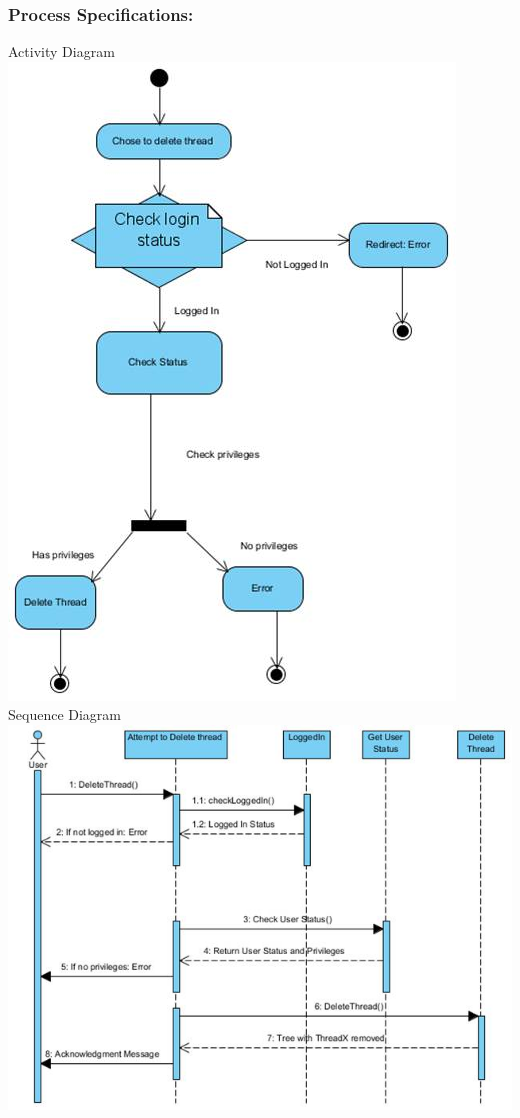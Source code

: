 \documentclass[a4paper,11pt]{article}
\begin{document}
\subsubsection{Process Specifications:} 
Activity Diagram\\
\includegraphics[width=1\linewidth]{./Images/CRUDThread/Diagrams/15.jpg}\\
\newpage
Sequence Diagram\\
\includegraphics[width=1\linewidth]{./Images/CRUDThread/Diagrams/16.jpg}\\
\end{document}

